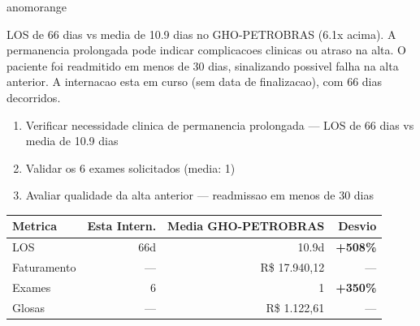 \documentclass[a4paper,10pt]{article}
\begin{document}
\begin{anomalycard}[Internacao 162172 | GHO-PETROBRAS | ALTO (z=3.30)]{anomorange}
\vspace{2pt}\begin{tcolorbox}[colback=severityred!20,colframe=anomorange,title={\textbf{Interpretacao de Negocio}},fonttitle=\bfseries\small,left=4pt,right=4pt,top=3pt,bottom=3pt]
{\small LOS de 66 dias vs media de 10.9 dias no GHO-PETROBRAS (6.1x acima). A permanencia prolongada pode indicar complicacoes clinicas ou atraso na alta. O paciente foi readmitido em menos de 30 dias, sinalizando possivel falha na alta anterior. A internacao esta em curso (sem data de finalizacao), com 66 dias decorridos.}
\end{tcolorbox}
\begin{tcolorbox}[colback=severityyellow!30,colframe=anomorange,title={\textbf{Recomendacoes Especificas}},fonttitle=\bfseries\small,left=4pt,right=4pt,top=3pt,bottom=3pt]
\begin{enumerate}[nosep,leftmargin=16pt]
\item {\small Verificar necessidade clinica de permanencia prolongada --- LOS de 66 dias vs media de 10.9 dias}
\item {\small Validar os 6 exames solicitados (media: 1)}
\item {\small Avaliar qualidade da alta anterior --- readmissao em menos de 30 dias}
\end{enumerate}
\end{tcolorbox}
\begin{center}\begin{tabular}{l r r r}\toprule\textbf{Metrica} & \textbf{Esta Intern.} & \textbf{Media GHO-PETROBRAS} & \textbf{Desvio} \\\midrule
LOS & 66d & 10.9d & \textcolor{anomred}{\textbf{+508\%}} \\
Faturamento & --- & R\$ 17.940,12 & --- \\
Exames & 6 & 1 & \textcolor{anomred}{\textbf{+350\%}} \\
Glosas & --- & R\$ 1.122,61 & --- \\
\bottomrule\end{tabular}\end{center}


\end{anomalycard}
\end{document}
